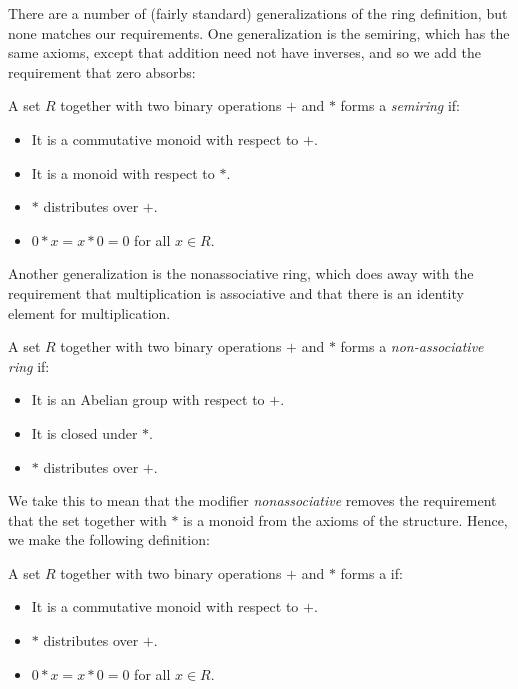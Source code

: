 There are a number of (fairly standard)  generalizations of the ring definition, but none matches our requirements. One generalization is the semiring, which has the same axioms, except that addition need not have inverses, and so we add the requirement that zero absorbs:
\begin{Definition}
A set $R$ together with two binary operations $+$ and $*$ forms a \emph{semiring} if:
\begin{itemize}
\item It is a commutative monoid with respect to $+$.
\item It is a monoid with respect to $*$.
\item $*$ distributes over $+$.
\item $0 * x = x * 0 = 0$ for all $x \in R$.
\end{itemize}
\end{Definition}
Another generalization is the nonassociative ring, which does away with the requirement that multiplication is associative and that there is an identity element for multiplication.
\begin{Definition}
A set $R$ together with two binary operations $+$ and $*$ forms a \emph{non-associative ring} if:
\begin{itemize}
\item It is an Abelian group with respect to $+$.
\item It is closed under $*$.
\item $*$ distributes over $+$.
\end{itemize}
\end{Definition}
We take this to mean that the modifier \emph{nonassociative} removes the requirement that the set together with $*$ is a monoid from the axioms of the structure. Hence, we make the following definition:
\begin{Definition}
A set $R$ together with two binary operations $+$ and $*$ forms a \emph{\nanring} if:
\begin{itemize}
\item It is a commutative monoid with respect to $+$.
\item $*$ distributes over $+$.
\item $0 * x = x * 0 = 0$ for all $x \in R$.
\end{itemize}
\end{Definition}

